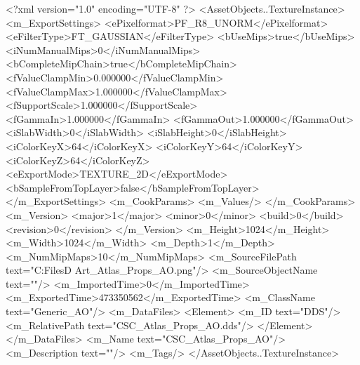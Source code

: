 <?xml version="1.0" encoding="UTF-8" ?>
<AssetObjects..TextureInstance>
	<m_ExportSettings>
		<ePixelformat>PF_R8_UNORM</ePixelformat>
		<eFilterType>FT_GAUSSIAN</eFilterType>
		<bUseMips>true</bUseMips>
		<iNumManualMips>0</iNumManualMips>
		<bCompleteMipChain>true</bCompleteMipChain>
		<fValueClampMin>0.000000</fValueClampMin>
		<fValueClampMax>1.000000</fValueClampMax>
		<fSupportScale>1.000000</fSupportScale>
		<fGammaIn>1.000000</fGammaIn>
		<fGammaOut>1.000000</fGammaOut>
		<iSlabWidth>0</iSlabWidth>
		<iSlabHeight>0</iSlabHeight>
		<iColorKeyX>64</iColorKeyX>
		<iColorKeyY>64</iColorKeyY>
		<iColorKeyZ>64</iColorKeyZ>
		<eExportMode>TEXTURE_2D</eExportMode>
		<bSampleFromTopLayer>false</bSampleFromTopLayer>
	</m_ExportSettings>
	<m_CookParams>
		<m_Values/>
	</m_CookParams>
	<m_Version>
		<major>1</major>
		<minor>0</minor>
		<build>0</build>
		<revision>0</revision>
	</m_Version>
	<m_Height>1024</m_Height>
	<m_Width>1024</m_Width>
	<m_Depth>1</m_Depth>
	<m_NumMipMaps>10</m_NumMipMaps>
	<m_SourceFilePath text="C:\Users\Shadow\Desktop\Working Files\3D Art\Textures\CSC_Atlas_Props_AO.png"/>
	<m_SourceObjectName text=""/>
	<m_ImportedTime>0</m_ImportedTime>
	<m_ExportedTime>473350562</m_ExportedTime>
	<m_ClassName text="Generic_AO"/>
	<m_DataFiles>
		<Element>
			<m_ID text="DDS"/>
			<m_RelativePath text="CSC_Atlas_Props_AO.dds"/>
		</Element>
	</m_DataFiles>
	<m_Name text="CSC_Atlas_Props_AO"/>
	<m_Description text=""/>
	<m_Tags/>
</AssetObjects..TextureInstance>

